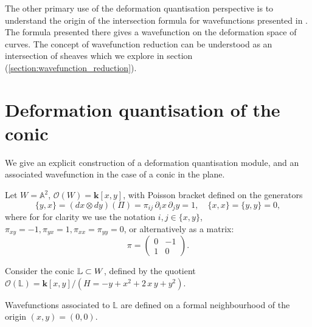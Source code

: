     The other primary use of the deformation quantisation perspective is to understand the origin of the intersection formula for wavefunctions presented in \cite[ section (7.2)]{ks_airy}. The formula presented there gives a wavefunction on the deformation space of curves. The concept of wavefunction reduction can be understood as an intersection of sheaves which we explore in section (\ref{section:wavefunction_reduction}).


    \section{Deformation quantisation of the conic}
    \label{sec:def_of_conic}
    
    We give an explicit construction of a deformation quantisation module, and an associated wavefunction in the case of a conic in the plane.
    
    Let \( W = \mathbb{A}^2\), \(\mathcal{O}(W) = \mathbf{k}[x,y]\), with Poisson bracket defined on the generators \[ \{y,x\}=  (dx\otimes dy) ( \Pi) = \pi_{ij} \,\partial_i x \, \partial_j y = 1, \quad \{x,x\} = \{y,y\}=0, \] 
    where for for clarity we use the notation \(i,j \in \{x,y\}\), \( \pi_{xy}=-1,\pi_{yx}= 1,\pi_{xx} = \pi_{yy}=0\), or alternatively as a matrix: 
    \[ \pi = \left( \begin{array}{cc}
         0 &-1  \\
         1 & 0 
    \end{array}\right).\]
       \begin{ex}
       \label{ex:the_conic}
        Consider the conic \( \mathbb{L} \subset W\), defined by the quotient \(\mathcal{O}(\mathbb{L})= \mathbf{k}[x,y]/(H = -y + x^2 + 2\, x\, y + y^2) \).
    \end{ex}
    Wavefunctions associated to \( \mathbb{L}\) are defined on a formal neighbourhood of the origin \((x,y)=(0,0)\).
    
